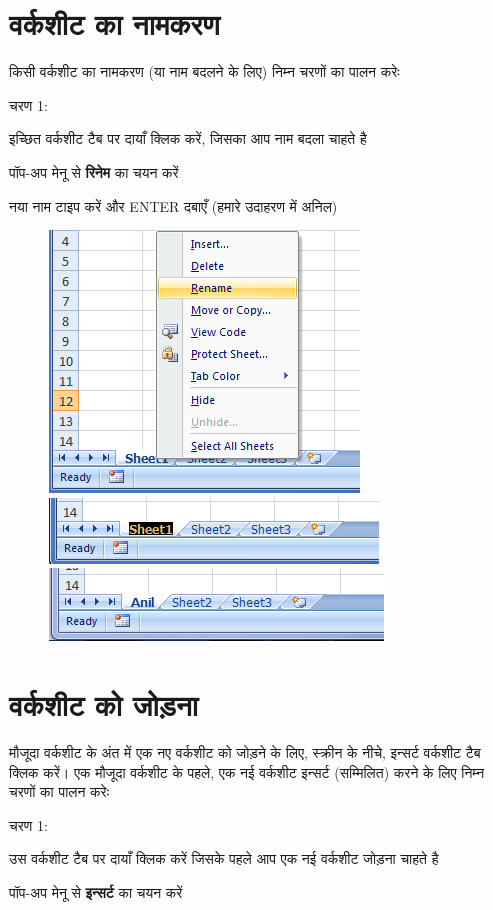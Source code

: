 \section{वर्कशीट का नामकरण}\label{id-1.8}

किसी वर्कशीट का नामकरण (या नाम बदलने के लिए) निम्न चरणों का पालन करेः
\begin{descriptionSimple}{चरण 1:}
\item[चरण 1] इच्छित वर्कशीट टैब पर दायाँ क्लिक करें, जिसका आप नाम बदला चाहते है
\item[चरण 2] पॉप-अप मेनू से \textbf{रिनेम} का चयन करें
\item[चरण 3] नया नाम टाइप करें और  {\eng ENTER}  दबाएँ (हमारे उदाहरण में अनिल)
\end{descriptionSimple}
\smallskip

\begin{figure}[H]
\centering
\includegraphics[scale=0.4]{src/images/chapter1/chapter1_fig10.png}
\includegraphics[scale=0.4]{src/images/chapter1/chapter1_fig11.png}
\includegraphics[scale=0.4]{src/images/chapter1/chapter1_fig12.png}
\end{figure}

\section{वर्कशीट को जोड़ना}\label{id-1.9}

मौजूदा वर्कशीट के अंत में एक नए वर्कशीट को जोड़ने के लिए, स्क्रीन के नीचे, इन्सर्ट वर्कशीट टैब क्लिक करें। एक मौजूदा वर्कशीट के पहले, एक नई वर्कशीट इन्सर्ट (सम्मिलित) करने के लिए निम्न चरणों का पालन करेः
\begin{descriptionSimple}{चरण 1:}
\item[चरण 1] उस वर्कशीट टैब पर दायाँ क्लिक करें जिसके पहले आप एक नई वर्कशीट जोड़ना चाहते है
\item[चरण 2] पॉप-अप मेनू से \textbf{इन्सर्ट} का चयन करें
\end{descriptionSimple}		

